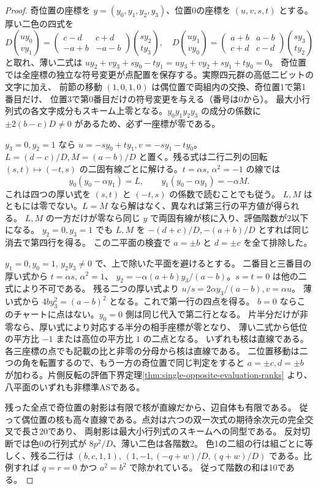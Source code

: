 \begin{proof}
奇位置の座標を $y=(y_0,y_1,y_2,y_3)$、位置0の座標を $(u,v,s,t)$ とする。
厚い二色の四式を
\[
 D\binom{uy_0}{vy_1}=\begin{pmatrix}c-d&c+d\\-a+b&-a-b\end{pmatrix}\binom{sy_2}{ty_3},\quad
 D\binom{uy_1}{vy_0}=\begin{pmatrix}a+b&a-b\\c+d&c-d\end{pmatrix}\binom{sy_3}{ty_2}
\]
と取れ、薄い二式は $uy_2+vy_3+sy_0-ty_1=uy_3+vy_2+sy_1+ty_0=0$。
奇位置では全座標の独立な符号変更が点配置を保存する。実際四元群の高低二ビットの文字に加え、
前節の移動 $(1,0,1,0)$ は偶位置で両組内の交換、奇位置1で第1番目だけ、
位置3で第0番目だけの符号変更を与える（番号は0から）。
最大小行列式の各文字成分もスキーム上零となる。$y_0y_1y_2y_3$ の成分の係数に
$\pm2(b-c)D\ne0$ があるため、必ず一座標が零である。

$y_3=0,y_2=1$ なら $u=-sy_0+ty_1,v=-sy_1-ty_0$。
$L=(d-c)/D,M=(a-b)/D$ と置く。残る式は二行二列の回転
$(s,t)\mapsto(-t,s)$ の二固有線ごとに解ける。$t=\alpha s$, $\alpha^2=-1$ の線では
\[
 y_0(y_0-\alpha y_1)=L,\qquad y_1(y_0-\alpha y_1)=-\alpha M .
\]
これは四つの厚い式を $(s,t)$ と $(-t,s)$ の係数で読むことでも従う。
$L,M$ はともには零でない。$L=M$ なら解はなく、異なれば第三行の平方値が得られる。
$L,M$ の一方だけが零なら同じ $y$ で両固有線が核に入り、評価階数が2以下になる。
$y_2=0,y_3=1$ でも $L,M$ を $-(d+c)/D,-(a+b)/D$ とすれば同じ消去で第四行を得る。
この二平面の検査で $a=\pm b$ と $d=\pm c$ を全て排除した。

$y_1=0,y_0=1$, $y_2y_3\ne0$ で、上で除いた平面を避けるとする。
二番目と三番目の厚い式から $t=\alpha s$, $\alpha^2=1$、
$y_2=-\alpha(a+b)y_3/(a-b)$。$s=t=0$ は他の二式により不可である。
残る二つの厚い式より $u/s=2\alpha y_3/(a-b), v=\alpha u$。
薄い式から $4b y_3^2=(a-b)^2$ となる。これで第一行の四点を得る。
$b=0$ ならこのチャートに点はない。$y_0=0$ 側は同じ代入で第二行となる。
片半分だけが非零なら、厚い式により対応する半分の相手座標が零となり、
薄い二式から低位の平方比 $-1$ または高位の平方比 $1$ の二点となる。
いずれも核は直線である。各三座標の点でも記載の比と非零の分母から核は直線である。
二位置移動は二つの角を転置するので、もう一方の奇位置で同じ判定をすると
$a=\pm c,d=\pm b$ が加わる。片側反転の評価下界定理\ref{thm:single-opposite-evaluation-ranks}
より、八平面のいずれも非標準ASである。

残った全点で奇位置の射影は有限で核が直線だから、辺自体も有限である。
従って偶位置の核も高々直線である。点対は六つの双一次式の期待余次元の完全交叉で長さ20であり、
両射影は最大小行列式のスキームへの同型である。
反対切断では色0の行列式が $8p^2/D$、薄い二色は各階数2。
色1の二組の行は組ごとに等しく、残る二行は $(b,c,1,1)$,
$(1,-1,(-q+w)/D,(q+w)/D)$ である。比例すれば $q=r=0$ かつ $a^2=b^2$ で除かれている。
従って階数の和は10である。


\end{proof}
